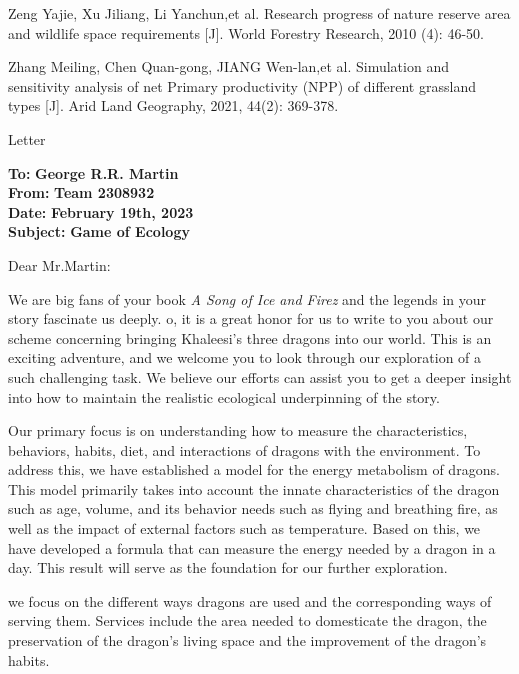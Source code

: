 \documentclass[12pt]{article}  %
\begin{document}
\begin{thebibliography}{99}
     Zeng Yajie, Xu Jiliang, Li Yanchun,et al. Research progress of nature reserve area and wildlife space requirements [J]. World Forestry Research, 2010 (4): 46-50. 

     Zhang Meiling, Chen Quan-gong, JIANG Wen-lan,et al. Simulation and sensitivity analysis of net Primary productivity (NPP) of different grassland types [J]. Arid Land Geography, 2021, 44(2): 369-378.

    
\end{thebibliography}



\begin{letter}{Letter\centering}
	\begin{flushleft}  %
		\textbf{To:} \textbf{George R.R. Martin}\\
		\textbf{From:} \textbf{Team 2308932}\\
		\textbf{Date:} \textbf{February 19th, 2023}\\
		\textbf{Subject:} \textbf{Game of Ecology}
	\end{flushleft}

\noindent Dear Mr.Martin:

 We are big fans of your book \textit{A Song of Ice and Firez} and the legends in your story fascinate us deeply. o, it is a great honor for us to write to you about our scheme concerning bringing Khaleesi's three dragons into our world. This is an exciting adventure, and we welcome you to look through our exploration of a such challenging task. We believe our efforts can assist you to get a deeper insight into how to maintain the realistic ecological underpinning of the story.

 Our primary focus is on understanding how to measure the characteristics, behaviors, habits, diet, and interactions of dragons with the environment. To address this, we have established a model for the energy metabolism of dragons. This model primarily takes into account the innate characteristics of the dragon such as age, volume, and its behavior needs such as flying and breathing fire, as well as the impact of external factors such as temperature. Based on this, we have developed a formula that can measure the energy needed by a dragon in a day. This result will serve as the foundation for our further exploration.

 
 we focus on the different ways dragons are used and the corresponding ways of serving them. Services include the area needed to domesticate the dragon, the preservation of the dragon's living space and the improvement of the dragon's habits.


\end{letter}
\end{document}
